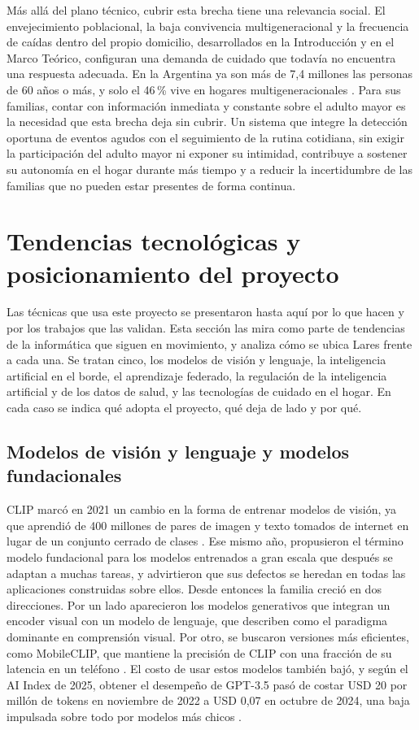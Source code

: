 Más allá del plano técnico, cubrir esta brecha tiene una relevancia social.
El envejecimiento poblacional, la baja convivencia multigeneracional y la frecuencia de caídas dentro del propio domicilio, desarrollados en la Introducción y en el Marco Teórico, configuran una demanda de cuidado que todavía no encuentra una respuesta adecuada.
En la Argentina ya son más de 7,4 millones las personas de 60 años o más, y solo el 46\,\% vive en hogares multigeneracionales \parencite{INDEC2024, INDECTablero2024}.
Para sus familias, contar con información inmediata y constante sobre el adulto mayor es la necesidad que esta brecha deja sin cubrir.
Un sistema que integre la detección oportuna de eventos agudos con el seguimiento de la rutina cotidiana, sin exigir la participación del adulto mayor ni exponer su intimidad, contribuye a sostener su autonomía en el hogar durante más tiempo y a reducir la incertidumbre de las familias que no pueden estar presentes de forma continua.

\section{Tendencias tecnológicas y posicionamiento del proyecto}
\label{sec:tendencias}

Las técnicas que usa este proyecto se presentaron hasta aquí por lo que hacen y por los trabajos que las validan.
Esta sección las mira como parte de tendencias de la informática que siguen en movimiento, y analiza cómo se ubica Lares frente a cada una.
Se tratan cinco, los modelos de visión y lenguaje, la inteligencia artificial en el borde, el aprendizaje federado, la regulación de la inteligencia artificial y de los datos de salud, y las tecnologías de cuidado en el hogar.
En cada caso se indica qué adopta el proyecto, qué deja de lado y por qué.

\subsection{Modelos de visión y lenguaje y modelos fundacionales}

CLIP marcó en 2021 un cambio en la forma de entrenar modelos de visión, ya que aprendió de 400 millones de pares de imagen y texto tomados de internet en lugar de un conjunto cerrado de clases \parencite{Radford2021}.
Ese mismo año, \textcite{Bommasani2021} propusieron el término modelo fundacional para los modelos entrenados a gran escala que después se adaptan a muchas tareas, y advirtieron que sus defectos se heredan en todas las aplicaciones construidas sobre ellos.
Desde entonces la familia creció en dos direcciones.
Por un lado aparecieron los modelos generativos que integran un encoder visual con un modelo de lenguaje, que \textcite{Zhang2024vlmsurvey} describen como el paradigma dominante en comprensión visual.
Por otro, se buscaron versiones más eficientes, como MobileCLIP, que mantiene la precisión de CLIP con una fracción de su latencia en un teléfono \parencite{Vasu2024}.
El costo de usar estos modelos también bajó, y según el AI Index de 2025, obtener el desempeño de GPT-3.5 pasó de costar USD 20 por millón de tokens en noviembre de 2022 a USD 0,07 en octubre de 2024, una baja impulsada sobre todo por modelos más chicos \parencite{Stanford2025}.

